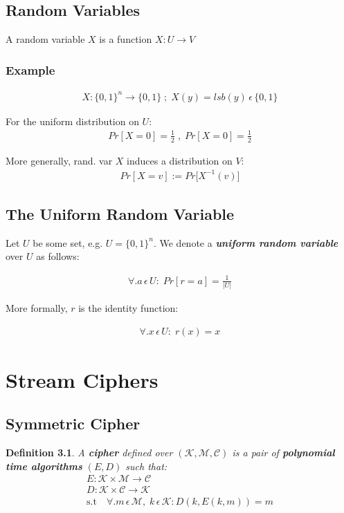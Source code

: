 \documentclass[11pt,a4paper]{report}
\newtheorem{deftheorem}{Definition}
\begin{document}
\section{Random Variables}
A random variable $X$ is a function $X : U \rightarrow V$

\subsection{Example}
\begin{gather*}
X : \{ 0,1 \}^n \rightarrow \{ 0,1 \} \; ; \; X(y) = lsb(y) \,\epsilon\, \{0,1\}
\end{gather*}

\noindent
For the uniform distribution on $U$:
\begin{gather*}
	Pr [X=0] = \frac{1}{2} \; , \; Pr [X=0] = \frac{1}{2}
\end{gather*}

\noindent
More generally, rand. var $X$ induces a distribution on $V$: 
\begin{gather*}
	Pr [X=v] := Pr \big[ X^{-1}(v) \big]
\end{gather*}

\section{The Uniform Random Variable}
Let $U$ be some set, e.g. $U = \{0,1\}^n$. We denote a \emph{\textbf{uniform random variable}} over $U$ as follows: 

\begin{gather*}
	\forall.a \,\epsilon\, U : \; Pr [r = a] = \frac{1}{|U|}
\end{gather*}

\noindent
More formally, $r$ is the identity function: 

\begin{gather*}
	\forall.x \,\epsilon\, U : \; r(x) = x
\end{gather*}

\chapter{Stream Ciphers}
\section{Symmetric Cipher}
\begin{deftheorem}
A \textbf{cipher} defined over $( \mathscr{K,M,C} )$ is a pair of \textbf{polynomial time algorithms} $(E,D)$ such that:
	\begin{gather*}
		E : \mathscr{K} \times \mathscr{M} \rightarrow \mathscr{C} \\
		D : \mathscr{K} \times \mathscr{C} \rightarrow \mathscr{K} \\
		\textrm{s.t} \quad \forall.m \,\epsilon\, \mathscr{M},\; k \,\epsilon\, \mathscr{K} : D(k, E(k, m)) = m
	\end{gather*}
\end{deftheorem}
\end{document}
